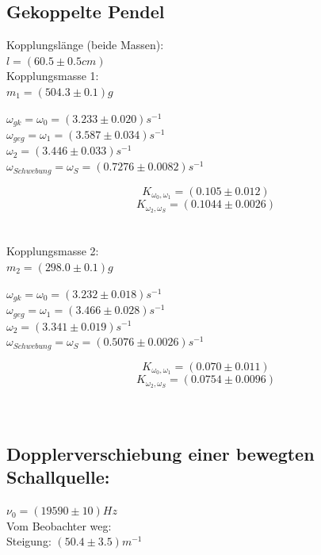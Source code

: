 \documentclass[12pt,a4paper]{article}
\begin{document}
\pagebreak
\begin{multicols}{2}




\subsection{Gekoppelte Pendel}

\noindent Kopplungslänge (beide Massen):\\
$l = (60.5 \pm 0.5 cm)$\\

\noindent Kopplungsmasse 1:\\
$m_1 = (504.3 \pm 0.1)g$

\noindent $\omega_{gk} = \omega_0 = (3.233 \pm 0.020)s^{-1}$\\
$\omega_{geg} = \omega_1 = (3.587\pm 0.034)s^{-1}$\\
$\omega_2 = (3.446 \pm 0.033)s^{-1}$\\
$\omega_{Schwebung}=\omega_S=(0.7276 \pm 0.0082)s^{-1}$

$$K_{\omega_0,\omega_1}=(0.105 \pm 0.012)$$
$$K_{\omega_2,\omega_S}=(0.1044 \pm 0.0026)$$
\\
\\
\noindent Kopplungsmasse 2:\\
$m_2 = (298.0 \pm 0.1)g$

\noindent $\omega_{gk} = \omega_0 = (3.232 \pm 0.018)s^{-1}$\\
$\omega_{geg} = \omega_1 = (3.466\pm 0.028)s^{-1}$\\
$\omega_2 = (3.341 \pm 0.019)s^{-1}$\\
$\omega_{Schwebung}=\omega_S=(0.5076 \pm 0.0026)s^{-1}$

$$K_{\omega_0,\omega_1}=(0.070 \pm 0.011)$$
$$K_{\omega_2,\omega_S}=(0.0754 \pm 0.0096)$$
\\
\\
\subsection{Dopplerverschiebung einer bewegten Schallquelle:}
$\nu_0 = (19590 \pm 10 ) Hz$\\

\noindent Vom Beobachter weg:\\
Steigung: $(50.4\pm 3.5) m^{-1}$\\


\end{multicols}
\end{document}
